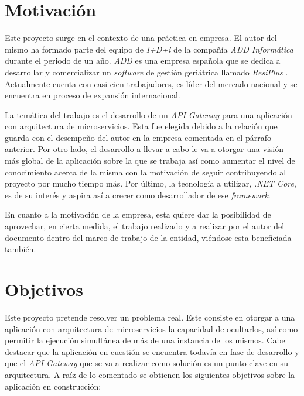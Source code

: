 \documentclass[11pt,spanish,listoffigures]{tfgetsinf}
\begin{document}
\section{Motivación}

Este proyecto surge en el contexto de una práctica en empresa. El autor del mismo ha formado parte del equipo de \emph{I+D+i} de la compañía \emph{ADD Informática} durante el periodo de un año. \emph{ADD} es una empresa española que se dedica a desarrollar y comercializar un \emph{software} de gestión geriátrica llamado \emph{ResiPlus} \cite{ResiPlus}. Actualmente cuenta con casi cien trabajadores, es líder del mercado nacional y se encuentra en proceso de expansión internacional.

La temática del trabajo es el desarrollo de un \emph{API Gateway} para una aplicación con arquitectura de microservicios. Esta fue elegida debido a la relación que guarda con el desempeño del autor en la empresa comentada en el párrafo anterior. Por otro lado, el desarrollo a llevar a cabo le va a otorgar una visión más global de la aplicación sobre la que se trabaja así como aumentar el nivel de conocimiento acerca de la misma con la motivación de seguir contribuyendo al proyecto por mucho tiempo más. Por último, la tecnología a utilizar, \emph{.NET Core}, es de su interés y aspira así a crecer como desarrollador de ese \emph{framework}.

En cuanto a la motivación de la empresa, esta quiere dar la posibilidad de aprovechar, en cierta medida, el trabajo realizado y a realizar por el autor del documento dentro del marco de trabajo de la entidad, viéndose esta beneficiada también.

\section{Objetivos}

Este proyecto pretende resolver un problema real. Este consiste en otorgar a una aplicación con arquitectura de microservicios la capacidad de ocultarlos, así como permitir la ejecución simultánea de más de una instancia de los mismos. Cabe destacar que la aplicación en cuestión se encuentra todavía en fase de desarrollo y que el \emph{API Gateway} que se va a realizar como solución es un punto clave en su arquitectura. A raíz de lo comentado se obtienen los siguientes objetivos sobre la aplicación en construcción:
\end{document}
